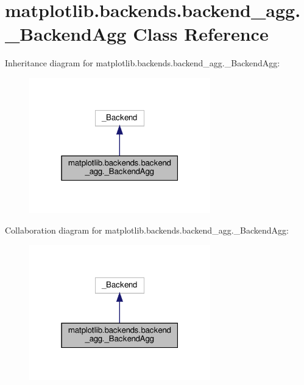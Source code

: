 \hypertarget{classmatplotlib_1_1backends_1_1backend__agg_1_1__BackendAgg}{}\section{matplotlib.\+backends.\+backend\+\_\+agg.\+\_\+\+Backend\+Agg Class Reference}
\label{classmatplotlib_1_1backends_1_1backend__agg_1_1__BackendAgg}


Inheritance diagram for matplotlib.\+backends.\+backend\+\_\+agg.\+\_\+\+Backend\+Agg\+:
\nopagebreak
\begin{figure}[H]
\begin{center}
\leavevmode
\includegraphics[width=223pt]{classmatplotlib_1_1backends_1_1backend__agg_1_1__BackendAgg__inherit__graph}
\end{center}
\end{figure}


Collaboration diagram for matplotlib.\+backends.\+backend\+\_\+agg.\+\_\+\+Backend\+Agg\+:
\nopagebreak
\begin{figure}[H]
\begin{center}
\leavevmode
\includegraphics[width=223pt]{classmatplotlib_1_1backends_1_1backend__agg_1_1__BackendAgg__coll__graph}
\end{center}
\end{figure}
